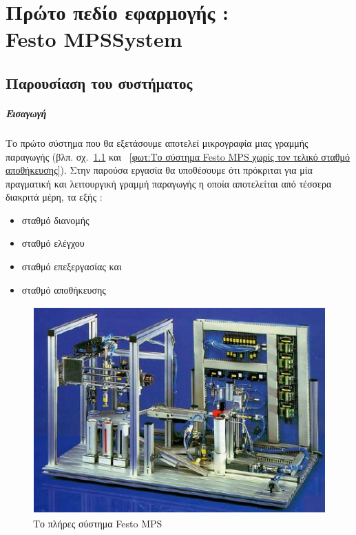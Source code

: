 \documentclass[a4paper,12pt,twoside]{report}
\begin{document}
{		
	\chapter{Πρώτο πεδίο εφαρμογής :\\ Festo MPS\textregistered  System}
		\label{κεφ.:Πρώτο πεδίο εφαρμογής : MPS System}

		\section{Παρουσίαση του συστήματος}
		
			\paragraph{Εισαγωγή} {Το πρώτο σύστημα που θα εξετάσουμε αποτελεί μικρογραφία μιας γραμμής παραγωγής {\footnotesize (βλπ. σχ.~\ref{φωτ:Το πλήρες σύστημα Festo MPS} και ~\ref{φωτ:Το σύστημα Festo MPS χωρίς τον τελικό σταθμό αποθήκευσης})}. Στην παρούσα εργασία θα υποθέσουμε ότι πρόκριται για μία πραγματική και λειτουργική γραμμή παραγωγής η οποία αποτελείται από τέσσερα διακριτά μέρη, τα εξής :
			}
			\begin{itemize}
				\item σταθμό διανομής
				\item σταθμό ελέγχου
				\item σταθμό επεξεργασίας και
				\item σταθμό αποθήκευσης
			\end{itemize}
			
			\begin{figure}[hp]
					\centering
					\includegraphics[scale=0.75]{FestoMPSSystem2.png}
					\caption{Το πλήρες σύστημα Festo MPS\textregistered}
					\label{φωτ:Το πλήρες σύστημα Festo MPS}
			\end{figure}
			
}
\end{document}
